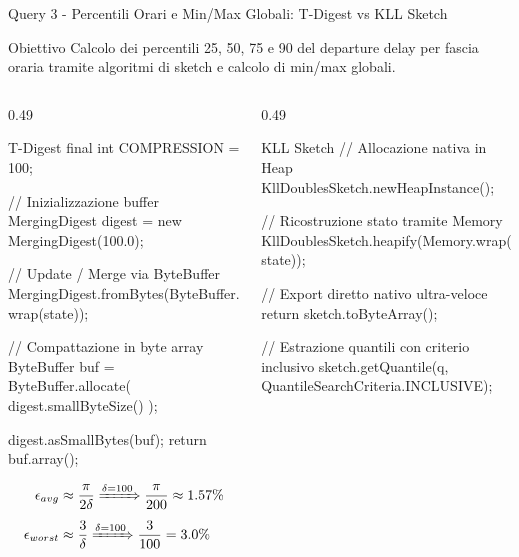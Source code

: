 \documentclass[10pt, aspectratio=169]{beamer}
\newcommand{\queryobjective}[1]{
    \vspace{-0.5cm}
    \begin{exampleblock}{\footnotesize Obiettivo}
    \scriptsize #1
    \end{exampleblock}
    \vfill
}
\begin{document}
\begin{frame}[fragile, t]{Query 3 - Percentili Orari e Min/Max Globali: T-Digest vs KLL Sketch}

    \queryobjective{Calcolo dei percentili 25, 50, 75 e 90 del departure delay per fascia oraria tramite algoritmi di sketch e calcolo di min/max globali.}

    \begin{columns}[c]

        \begin{column}{0.49\textwidth}
            \begin{appcodebox}{T-Digest}
final int COMPRESSION = 100;

// Inizializzazione buffer
MergingDigest digest = new MergingDigest(100.0);

// Update / Merge via ByteBuffer
MergingDigest.fromBytes(ByteBuffer.wrap(state));

// Compattazione in byte array
ByteBuffer buf = ByteBuffer.allocate(
digest.smallByteSize()
);

digest.asSmallBytes(buf);
return buf.array();
            \end{appcodebox}

            {\footnotesize
                \[
                    \begin{aligned}
                        \epsilon_{avg} &\approx \frac{\pi}{2\delta} \xRightarrow{\delta=100} \frac{\pi}{200} \approx 1.57\% \\[1ex]
                        \epsilon_{worst} &\approx \frac{3}{\delta} \xRightarrow{\delta=100} \frac{3}{100} = 3.0\%
                    \end{aligned}
                \]
            }

        \end{column}

        \begin{column}{0.49\textwidth}
            \begin{appcodebox}{KLL Sketch}
// Allocazione nativa in Heap
KllDoublesSketch.newHeapInstance();

// Ricostruzione stato tramite Memory
KllDoublesSketch.heapify(Memory.wrap(state));

// Export diretto nativo ultra-veloce
return sketch.toByteArray();

// Estrazione quantili con criterio inclusivo
sketch.getQuantile(q,
QuantileSearchCriteria.INCLUSIVE);
            \end{appcodebox}


\end{column}
\end{columns}
\end{frame}
\end{document}
